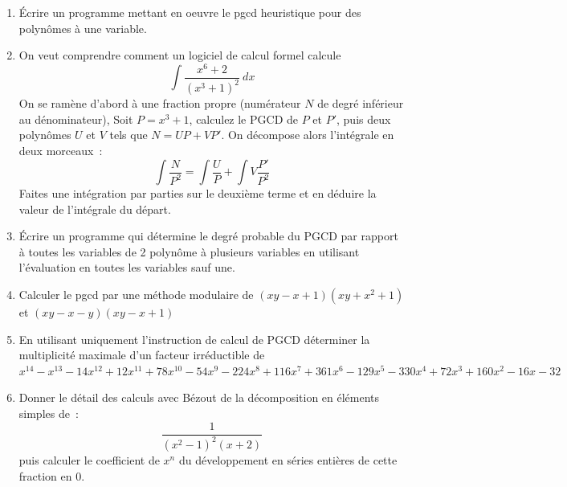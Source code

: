 \documentclass[a4paper,11pt]{book}
\begin{document}
\begin{giacjshere}
\begin{enumerate}
\item \'Ecrire un programme mettant en oeuvre le pgcd heuristique
pour des polyn\^omes \`a une variable.

\item On veut comprendre comment un logiciel de calcul formel calcule
\[ \int \frac{x^6+2}{(x^3+1)^2} \ dx \]
On se ramène d'abord à une fraction propre (num\'erateur $N$ de degr\'e 
inf\'erieur au d\'enominateur),
Soit $P=x^3+1$, calculez le PGCD de $P$ et $P'$, puis
deux polyn\^omes $U$ et $V$ tels que $ N=UP+VP' $.
On d\'ecompose alors l'int\'egrale en deux morceaux~:\\
\[ \int \frac{N}{P^2}=\int \frac{U}{P}  + \int V \frac{P'}{P^2}  \]
Faites une int\'egration par parties sur le deuxi\`eme terme
et en d\'eduire la valeur de l'int\'egrale du d\'epart.


\item \'Ecrire un programme qui d\'etermine le degr\'e probable du PGCD 
par rapport \`a toutes les
variables de 2 polyn\^ome \`a plusieurs variables
en utilisant l'\'evaluation en toutes les variables
sauf une.

\item Calculer le pgcd par une m\'ethode modulaire de
$(xy-x+1)(xy+x^2+1)$ et $(xy-x-y)(xy-x+1)$

\item En utilisant uniquement l'instruction de calcul de PGCD
d\'eterminer la multiplicit\'e maximale d'un facteur irr\'eductible
de 
$x^{14}-x^{13}-14x^{12}+12x^{11}+78x^{10}-54x^9-224x^8+116x^7+361x^6-129x^5-330x^4+72x^3+160x^2-16x-32$

\item Donner le d\'etail des calculs avec B\'ezout de la d\'ecomposition
en \'el\'ements simples de~:
\[ \frac{1}{(x^2-1)^2(x+2)}\]
puis calculer le coefficient de $x^n$ du d\'eveloppement en s\'eries
enti\`eres de cette fraction en 0.

\end{enumerate}


\end{giacjshere}
\end{document}

